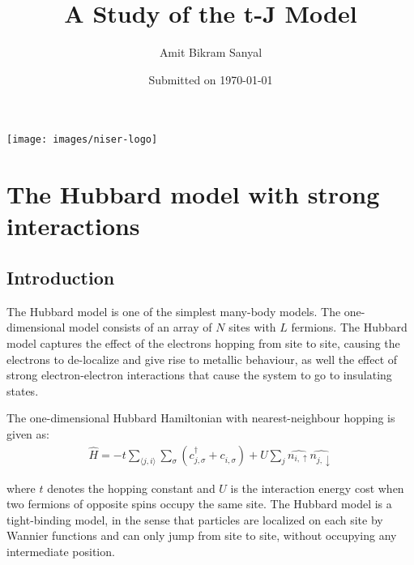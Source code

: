 \documentclass[]{report}
\title{A Study of the t-J Model\vspace{-5mm}}
\author{Amit Bikram Sanyal}
\date{Submitted on \today}
\begin{document}
	
\begin{minipage}{\linewidth}
	\maketitle
\end{minipage}

\vfill

\begin{center}
	\texttt{[image: images/niser-logo]}
\end{center}


\newpage
\tableofcontents
\thispagestyle{empty}

\begin{abstract}
	\lipsum[1]
\end{abstract}

\chapter{The Hubbard model with strong interactions}
\section{Introduction}
The Hubbard model is one of the simplest many-body models. The one-dimensional model consists of an array of $ N $ sites with $ L $ fermions. The Hubbard model captures the effect of the electrons hopping from site to site, causing the electrons to de-localize and give rise to metallic behaviour, as well the effect of strong electron-electron interactions that cause the system to go to insulating states.

The one-dimensional Hubbard Hamiltonian with nearest-neighbour hopping is given as:
\begin{align}
	\hat{H} = -t \sum_{\langle j, i \rangle } \sum_{\sigma} \left( c^{\dagger}_{j, \sigma} + c^{}_{i, \sigma} \right) + U \sum_{j} \hat{n_{i, \uparrow}} \hat{n_{j, \downarrow}}
\end{align}

where $ t $ denotes the hopping constant and $ U $ is the interaction energy cost when two fermions of opposite spins occupy the same site. The Hubbard model is a tight-binding model, in the sense that particles are localized on each site by Wannier functions and can only jump from site to site, without occupying any intermediate position.
\end{document}
